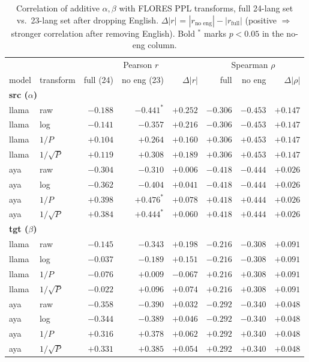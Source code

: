 \documentclass[11pt]{article}
\begin{document}
\begin{table}[h]
\centering
\small
\begin{tabular}{llrrr|rrr}
\toprule
 & & \multicolumn{3}{c|}{Pearson $r$} & \multicolumn{3}{c}{Spearman $\rho$} \\
model & transform & full (24) & no eng (23) & $\Delta |r|$ & full & no eng & $\Delta |\rho|$ \\
\midrule
\multicolumn{8}{l}{\textbf{src ($\alpha$)}} \\
llama & raw       & $-0.188$ & $\mathbf{-0.441^*}$ & $+0.252$ & $-0.306$ & $-0.453$ & $+0.147$ \\
llama & log       & $-0.141$ & $-0.357$ & $+0.216$ & $-0.306$ & $-0.453$ & $+0.147$ \\
llama & $1/P$     & $+0.104$ & $+0.264$ & $+0.160$ & $+0.306$ & $+0.453$ & $+0.147$ \\
llama & $1/\sqrt{P}$ & $+0.119$ & $+0.308$ & $+0.189$ & $+0.306$ & $+0.453$ & $+0.147$ \\
aya   & raw       & $-0.304$ & $-0.310$ & $+0.006$ & $-0.418$ & $-0.444$ & $+0.026$ \\
aya   & log       & $-0.362$ & $-0.404$ & $+0.041$ & $-0.418$ & $-0.444$ & $+0.026$ \\
aya   & $1/P$     & $+0.398$ & $\mathbf{+0.476^*}$ & $+0.078$ & $+0.418$ & $+0.444$ & $+0.026$ \\
aya   & $1/\sqrt{P}$ & $+0.384$ & $\mathbf{+0.444^*}$ & $+0.060$ & $+0.418$ & $+0.444$ & $+0.026$ \\
\midrule
\multicolumn{8}{l}{\textbf{tgt ($\beta$)}} \\
llama & raw       & $-0.145$ & $-0.343$ & $+0.198$ & $-0.216$ & $-0.308$ & $+0.091$ \\
llama & log       & $-0.037$ & $-0.189$ & $+0.151$ & $-0.216$ & $-0.308$ & $+0.091$ \\
llama & $1/P$     & $-0.076$ & $+0.009$ & $-0.067$ & $+0.216$ & $+0.308$ & $+0.091$ \\
llama & $1/\sqrt{P}$ & $-0.022$ & $+0.096$ & $+0.074$ & $+0.216$ & $+0.308$ & $+0.091$ \\
aya   & raw       & $-0.358$ & $-0.390$ & $+0.032$ & $-0.292$ & $-0.340$ & $+0.048$ \\
aya   & log       & $-0.344$ & $-0.389$ & $+0.046$ & $-0.292$ & $-0.340$ & $+0.048$ \\
aya   & $1/P$     & $+0.316$ & $+0.378$ & $+0.062$ & $+0.292$ & $+0.340$ & $+0.048$ \\
aya   & $1/\sqrt{P}$ & $+0.331$ & $+0.385$ & $+0.054$ & $+0.292$ & $+0.340$ & $+0.048$ \\
\bottomrule
\end{tabular}
\caption{Correlation of additive $\alpha, \beta$ with FLORES PPL
transforms, full 24-lang set vs.\ 23-lang set after dropping English.
$\Delta |r|$ = $|r_{\text{no eng}}| - |r_{\text{full}}|$ (positive
$\Rightarrow$ stronger correlation after removing English). Bold
$^*$ marks $p < 0.05$ in the no-eng column.}
\end{table}
\end{document}
